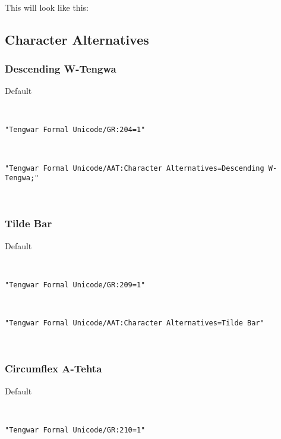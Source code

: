 \documentclass[11pt,a4paper]{article}
\begin{document}
\paragraph{} This will look like this: \myformal   \normalfont



\subsection{Character Alternatives}



\subsubsection{Descending W-Tengwa}


Default

\formalGR  

\noindent \texttt{"Tengwar Formal Unicode/GR:204=1"}

\formalGRdescw  

\noindent \texttt{"Tengwar Formal Unicode/AAT:Character Alternatives=Descending W-Tengwa;"}

\formalAATdescw   \normalfont



\subsubsection{Tilde Bar}


Default

\formalGR 

\noindent\texttt{"Tengwar Formal Unicode/GR:209=1"}

\formalGRtilde 

\noindent\texttt{"Tengwar Formal Unicode/AAT:Character Alternatives=Tilde Bar"}

\formalAATtilde  \normalfont



\subsubsection{Circumflex A-Tehta}


Default

\formalGR 

\noindent\texttt{"Tengwar Formal Unicode/GR:210=1"}

\formalGRcircumflex 
\end{document}
